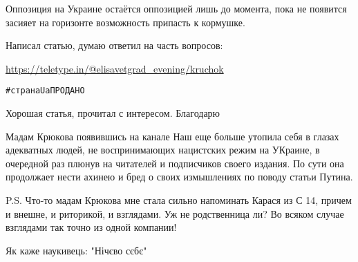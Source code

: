 \begin{itemize}
 

Оппозиция на Украине остаётся оппозицией лишь до момента, пока не появится
засияет на горизонте возможность припасть к кормушке.

Написал статью, думаю ответил на часть вопросов:

\url{https://teletype.in/@elisavetgrad_evening/kruchok}

 
\verb|#странаUaПРОДАНО|

 
Хорошая статья, прочитал с интересом. Благодарю

 

Мадам Крюкова появившись на канале Наш еще больше утопила себя в глазах
адекватных людей, не воспринимающих нацистских режим на УКраине, в очередной
раз плюнув на читателей и подписчиков своего издания. По сути она продолжает
нести ахинею и бред о своих измышлениях по поводу статьи Путина.

P.S. Что-то мадам Крюкова мне стала сильно напоминать Карася из С 14, причем и
внешне, и риторикой, и взглядами. Уж не родственница ли? Во всяком случае
взглядами так точно из одной компании!

 
Як каже наукивець: "Нічєво сєбє"

 


\end{itemize}
